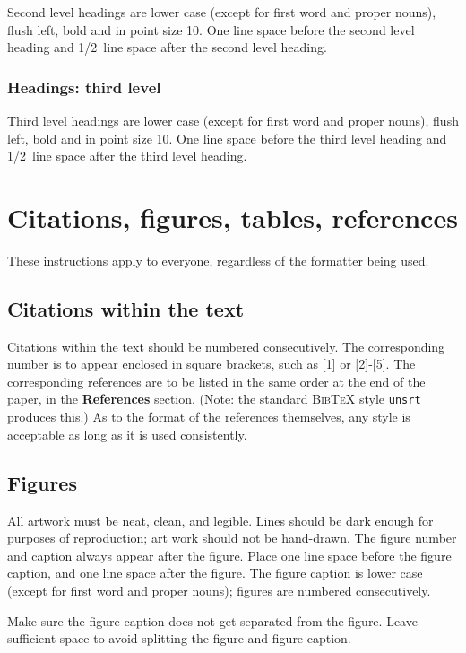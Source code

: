 \documentclass{article} %
\begin{document}
Second level headings are lower case (except for first word and proper nouns),
flush left, bold and in point size 10. One line space before the second level
heading and 1/2~line space after the second level heading.

\subsubsection{Headings: third level}

Third level headings are lower case (except for first word and proper nouns),
flush left, bold and in point size 10. One line space before the third level
heading and 1/2~line space after the third level heading.

\section{Citations, figures, tables, references}
\label{others}

These instructions apply to everyone, regardless of the formatter being used.

\subsection{Citations within the text}

Citations within the text should be numbered consecutively. The corresponding
number is to appear enclosed in square brackets, such as [1] or [2]-[5]. The
corresponding references are to be listed in the same order at the end of the
paper, in the \textbf{References} section. (Note: the standard
\textsc{Bib\TeX} style \texttt{unsrt} produces this.) As to the format of the
references themselves, any style is acceptable as long as it is used
consistently.

\subsection{Figures}

All artwork must be neat, clean, and legible. Lines should be dark
enough for purposes of reproduction; art work should not be
hand-drawn. The figure number and caption always appear after the
figure. Place one line space before the figure caption, and one line
space after the figure. The figure caption is lower case (except for
first word and proper nouns); figures are numbered consecutively.

Make sure the figure caption does not get separated from the figure.
Leave sufficient space to avoid splitting the figure and figure caption.
\end{document}
